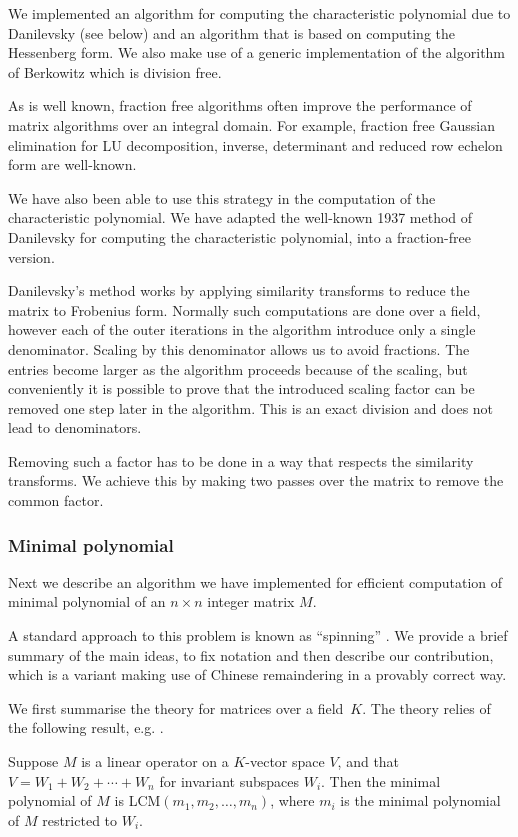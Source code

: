 \documentclass{sig-alternate-05-2015}
\begin{document}
We implemented an algorithm for computing the characteristic polynomial due to
Danilevsky (see below) and an algorithm that is based on computing the Hessenberg
form. We also make use of a generic implementation of the algorithm of Berkowitz which
is division free. 

As is well known, fraction free algorithms often improve the performance of matrix
algorithms over an integral domain. For example, fraction free Gaussian elimination
for LU decomposition, inverse, determinant and reduced row echelon form
are well-known.

We have also been able to use this strategy in the computation
of the characteristic polynomial. We have adapted the well-known 1937 method
of Danilevsky \cite{danilevsky} for computing the characteristic polynomial, into
a fraction-free version.

Danilevsky's method works by applying similarity transforms to reduce the
matrix to Frobenius form. Normally such computations are done over a
field, however each of the outer iterations in the algorithm introduce only
a single denominator. Scaling by this denominator allows us to avoid
fractions.
The entries become larger
as the algorithm proceeds because of the scaling, but conveniently
it is possible to prove that the introduced scaling factor can be removed 
one step later in the algorithm. This is an exact division and does not
lead to denominators.

Removing such a factor has to be done in a way that respects the
similarity transforms. We achieve this by making two passes over the matrix
to remove the common factor.

\subsubsection{Minimal polynomial}

Next we describe an algorithm we have implemented for efficient
computation of minimal polynomial of an $n\times n$ integer matrix $M$.

A standard approach to this problem is known as ``spinning'' \cite{steel}.
We provide a brief summary of the main ideas, to fix notation and then
describe our contribution, which is a variant making use of Chinese
remaindering in a provably correct way.

We first summarise the theory for matrices over a field~$K$. The theory
relies of the following result, e.g. \cite{vinberg}.

\begin{theorem}
Suppose $M$ is a linear operator on a $K$-vector space $V$, and that
$V = W_1 + W_2 + \cdots + W_n$ for invariant subspaces $W_i$. Then the
minimal polynomial of $M$ is LCM$(m_1, m_2, \ldots, m_n)$, where $m_i$ is
the minimal polynomial of $M$ restricted to $W_i$.
\end{theorem}
\end{document}
